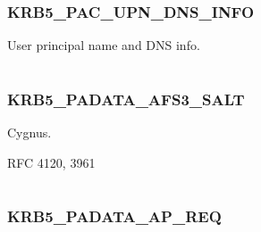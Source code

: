 \documentclass[letterpaper,10pt,english]{sphinxmanual}
\begin{document}
\subsubsection{KRB5\_PAC\_UPN\_DNS\_INFO}
\label{appdev/refs/macros/KRB5_PAC_UPN_DNS_INFO:krb5-pac-upn-dns-info-data}\label{appdev/refs/macros/KRB5_PAC_UPN_DNS_INFO::doc}\label{appdev/refs/macros/KRB5_PAC_UPN_DNS_INFO:krb5-pac-upn-dns-info}

\begin{fulllineitems}
\label{appdev/refs/macros/KRB5_PAC_UPN_DNS_INFO:KRB5_PAC_UPN_DNS_INFO}
\end{fulllineitems}


User principal name and DNS info.

\begin{tabulary}{\linewidth}{|L|L|}
\hline

 & 
\\\hline
\end{tabulary}



\subsubsection{KRB5\_PADATA\_AFS3\_SALT}
\label{appdev/refs/macros/KRB5_PADATA_AFS3_SALT::doc}\label{appdev/refs/macros/KRB5_PADATA_AFS3_SALT:krb5-padata-afs3-salt}\label{appdev/refs/macros/KRB5_PADATA_AFS3_SALT:krb5-padata-afs3-salt-data}

\begin{fulllineitems}
\label{appdev/refs/macros/KRB5_PADATA_AFS3_SALT:KRB5_PADATA_AFS3_SALT}
\end{fulllineitems}


Cygnus.

RFC 4120, 3961

\begin{tabulary}{\linewidth}{|L|L|}
\hline

 & 
\\\hline
\end{tabulary}



\subsubsection{KRB5\_PADATA\_AP\_REQ}
\label{appdev/refs/macros/KRB5_PADATA_AP_REQ::doc}\label{appdev/refs/macros/KRB5_PADATA_AP_REQ:krb5-padata-ap-req-data}\label{appdev/refs/macros/KRB5_PADATA_AP_REQ:krb5-padata-ap-req}
\end{document}

